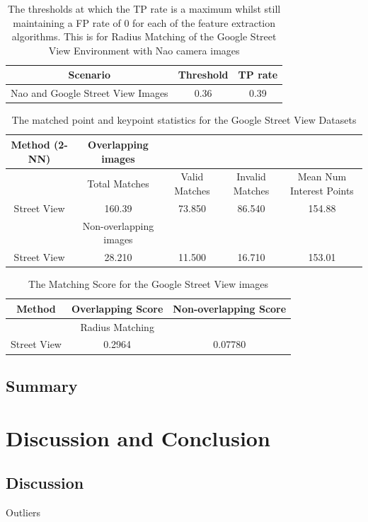 \documentclass{report}
\begin{document}
\begin{table}
\caption{The thresholds at which the TP rate is a maximum whilst still maintaining
a FP rate of 0 for each of the feature extraction algorithms. This
is for Radius Matching of the Google Street View Environment with
Nao camera images}
\begin{tabular}{|c|c|c|}
\hline 
Scenario & Threshold & TP rate\tabularnewline
\hline 
\hline 
Nao and Google Street View Images & 0.36 & 0.39\tabularnewline
\hline 
\end{tabular}
\label{tab:tpStreetView}
\end{table}

\begin{table}
\caption{The matched point and keypoint statistics for the Google Street View
Datasets}
\begin{tabular}{|c|c|c|c|c|}
\hline 
Method (2-NN) & Overlapping images &  &  & \tabularnewline
\hline 
\hline 
 & Total Matches & Valid Matches & Invalid Matches & Mean Num Interest Points\tabularnewline
\hline 
Street View  & 160.39 & 73.850 & 86.540 & 154.88\tabularnewline
\hline 
 & Non-overlapping images &  &  & \tabularnewline
\hline 
Street View & 28.210 & 11.500 & 16.710 & 153.01\tabularnewline
\hline 
\end{tabular}
\label{tab:gsMK}
\end{table}

\begin{table}
\caption{The Matching Score for the Google Street View images}
\begin{tabular}{|c|c|c|}
\hline 
Method & Overlapping Score & Non-overlapping Score\tabularnewline
\hline 
\hline 
 & Radius Matching & \tabularnewline
\hline 
Street View & 0.2964 & 0.07780\tabularnewline
\hline 
\end{tabular}
\label{tab:gsMS}
\end{table}

\section{Summary}
\label{sec:summary}

\chapter{Discussion and Conclusion}
\label{sec:discussionConclusion}

\section{Discussion}
\label{sec:discussion}
Outliers
\end{document}
